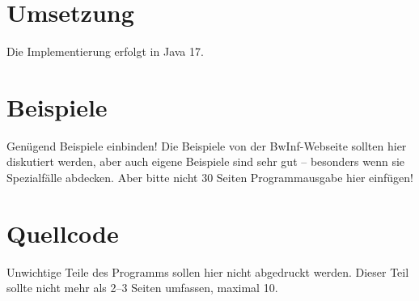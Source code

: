 \section{Umsetzung}\label{sec:umsetzung}
Die Implementierung erfolgt in Java 17.


\section{Beispiele}\label{sec:beispiele}
Genügend Beispiele einbinden!
Die Beispiele von der BwInf-Webseite sollten hier diskutiert werden, aber auch eigene Beispiele sind
sehr gut – besonders wenn sie Spezialfälle abdecken.
Aber bitte nicht 30 Seiten Programmausgabe hier einfügen!


\section{Quellcode}\label{sec:quellcode}
Unwichtige Teile des Programms sollen hier nicht abgedruckt werden.
Dieser Teil sollte nicht mehr als 2–3 Seiten umfassen, maximal 10.

